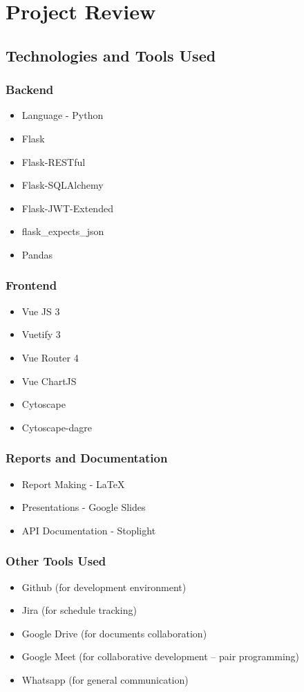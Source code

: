 \newpage

\section{Project Review}
\subsection{Technologies and Tools Used}
\subsubsection{Backend}
\begin{itemize}
    \tightlist
    \item Language - Python
    \item Flask
    \item Flask-RESTful
    \item Flask-SQLAlchemy
    \item Flask-JWT-Extended
    \item flask\_expects\_json
    \item Pandas
\end{itemize}

\subsubsection{Frontend}
\begin{itemize}
    \tightlist    
    \item Vue JS 3
    \item Vuetify 3
    \item Vue Router 4
    \item Vue ChartJS
    \item Cytoscape
    \item Cytoscape-dagre
\end{itemize}

\subsubsection{Reports and Documentation}
\begin{itemize}
    \tightlist
    \item Report Making - \LaTeX
    \item Presentations - Google Slides
    \item API Documentation - Stoplight
\end{itemize}

\subsubsection{Other Tools Used}
\begin{itemize}
    \tightlist
    \item Github (for development environment)
    \item Jira (for schedule tracking)
    \item Google Drive (for documents collaboration)
    \item Google Meet (for collaborative development – pair programming) 
    \item Whatsapp (for general communication)
\end{itemize}

